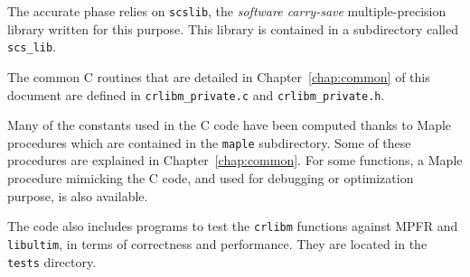 The accurate phase relies on \texttt{scslib}, the \emph{software
  carry-save} multiple-precision library written for this purpose.
This library is contained in a subdirectory called \texttt{scs\_lib}.

The common C routines that are detailed in Chapter~\ref{chap:common} of
this document are defined in \texttt{crlibm\_private.c} and
\texttt{crlibm\_private.h}.

Many of the constants used in the C code have been computed thanks to
Maple procedures which are contained in the \texttt{maple}
subdirectory. Some of these procedures are explained in
Chapter~\ref{chap:common}. For some functions, a Maple procedure
mimicking the C code, and used for debugging or optimization purpose,
is also available.


The code also includes programs to test the \texttt{crlibm} functions
against MPFR and \texttt{libultim}, in terms of correctness and
performance. They are located in the \texttt{tests} directory.


